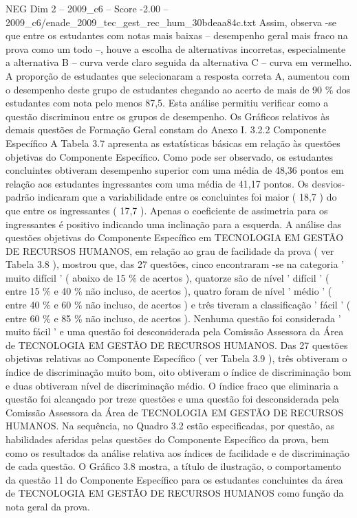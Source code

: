 \begin{textsample}{NEG Dim 2 – 2009\_c6 – Score -2.00 – 2009\_c6/enade\_2009\_tec\_gest\_rec\_hum\_30bdeaa84c.txt}
Assim, observa -se que entre os estudantes com notas mais baixas – desempenho geral mais fraco na prova como um todo –, houve a escolha de alternativas incorretas, especialmente a alternativa B – curva verde claro seguida da alternativa C – curva em vermelho.
A proporção de estudantes que selecionaram a resposta correta A, aumentou com o desempenho deste grupo de estudantes chegando ao acerto de mais de 90 \% dos estudantes com nota pelo menos 87,5.
Esta análise permitiu verificar como a questão discriminou entre os grupos de desempenho.
Os Gráficos relativos às demais questões de Formação Geral constam do Anexo I. 3.2.2 Componente Específico A Tabela 3.7 apresenta as estatísticas básicas em relação às questões objetivas do Componente Específico.
Como pode ser observado, os estudantes concluintes obtiveram desempenho superior com uma média de 48,36 pontos em relação aos estudantes ingressantes com uma média de 41,17 pontos.
Os desvios-padrão indicaram que a variabilidade entre os concluintes foi maior ( 18,7 ) do que entre os ingressantes ( 17,7 ).
Apenas o coeficiente de assimetria para os ingressantes é positivo indicando uma inclinação para a esquerda.
A análise das questões objetivas do Componente Específico em TECNOLOGIA EM GESTÃO DE RECURSOS HUMANOS, em relação ao grau de facilidade da prova ( ver Tabela 3.8 ), mostrou que, das 27 questões, cinco encontraram -se na categoria ' muito difícil ' ( abaixo de 15 \% de acertos ), quatorze são de nível ' difícil ' ( entre 15 \% e 40 \% não incluso, de acertos ), quatro foram de nível ' médio ' ( entre 40 \% e 60 \% não incluso, de acertos ) e três tiveram a classificação ' fácil ' ( entre 60 \% e 85 \% não incluso, de acertos ).
Nenhuma questão foi considerada ' muito fácil ' e uma questão foi desconsiderada pela Comissão Assessora da Área de TECNOLOGIA EM GESTÃO DE RECURSOS HUMANOS.
Das 27 questões objetivas relativas ao Componente Específico ( ver Tabela 3.9 ), três obtiveram o índice de discriminação muito bom, oito obtiveram o índice de discriminação bom e duas obtiveram nível de discriminação médio.
O índice fraco que eliminaria a questão foi alcançado por treze questões e uma questão foi desconsiderada pela Comissão Assessora da Área de TECNOLOGIA EM GESTÃO DE RECURSOS HUMANOS.
Na sequência, no Quadro 3.2 estão especificadas, por questão, as habilidades aferidas pelas questões do Componente Específico da prova, bem como os resultados da análise relativa aos índices de facilidade e de discriminação de cada questão.
O Gráfico 3.8 mostra, a título de ilustração, o comportamento da questão 11 do Componente Específico para os estudantes concluintes da área de TECNOLOGIA EM GESTÃO DE RECURSOS HUMANOS como função da nota geral da prova.

\end{textsample}
